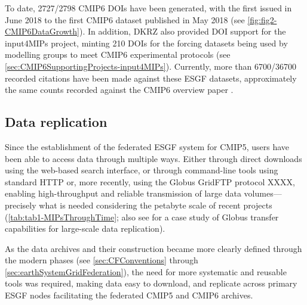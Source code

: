 \documentclass[manuscript]{copernicus}
\newcommand{\mycomment}[1]{}
\def\cred#1{{\color{red}#1}}
\begin{document}
To date, \cred{2727/2798} CMIP6 DOIs have been generated, with the first issued in June 2018 to the first CMIP6 dataset published in May 2018 (see \autoref{fig:fig2-CMIP6DataGrowth}). In addition, DKRZ also provided DOI support for the input4MIPs project, minting 210 DOIs for the forcing datasets being used by modelling groups to meet CMIP6 experimental protocols (see \autoref{sec:CMIP6SupportingProjects-input4MIPs}). Currently, more than \cred{6700/36700} recorded citations have been made against these ESGF datasets, approximately the same counts recorded against the CMIP6 overview paper \citep[see \autoref{sec:CMIP6Impact};][]{eyring_overview_2016}.

\mycomment{
https://www.ipcc-data.org/sim/gcm_monthly/AR5/WG1-Archive.html
https://www.wdc-climate.de/ui/statistics?type=cmip6_doi_registration
https://commons.datacite.org/repositories/8orcv25 - Master overview ~6720~ 36,758 [250823] citations
https://www.wdc-climate.de/ords/f?p=127:2 - CMIP6 data references
https://www.wdc-climate.de/ui/cmip6?input=CMIP6.ScenarioMIP.NOAA-GFDL.GFDL-CM4.ssp585
https://www.wdc-climate.de/ui/cmip6?input=input4MIPs.CMIP6.CMIP.PCMDI
}


\subsection{Data replication}
\label{sec:CMIPDataReplication}

Since the establishment of the federated ESGF system for CMIP5, users have been able to access data through multiple ways. Either through direct downloads using the web-based search interface, or through command-line tools using standard HTTP or, more recently, using the Globus GridFTP protocol XXXX, enabling high-throughput and reliable transmission of large data volumes---precisely what is needed considering the petabyte scale of recent projects (\autoref{tab:tab1-MIPsThroughTime}; also see \cite{lacinski_automated_2024} for a case study of Globus transfer capabilities for large-scale data replication).

As the data archives and their construction became more clearly defined through the modern phases (see \autoref{sec:CFConventions} through \autoref{sec:earthSystemGridFederation}), the need for more systematic and reusable tools was required, making data easy to download, and replicate across primary ESGF nodes facilitating the federated CMIP5 and CMIP6 archives.
\end{document}
